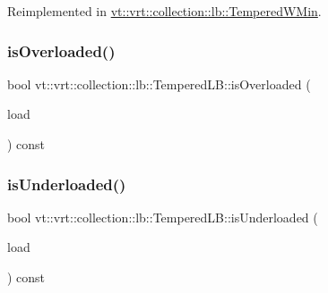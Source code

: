 Reimplemented in \hyperlink{structvt_1_1vrt_1_1collection_1_1lb_1_1_tempered_w_min_a0dd469ab6f3f8aebebf55c773df099ce}{vt\+::vrt\+::collection\+::lb\+::\+Tempered\+W\+Min}.

\mbox{\label{structvt_1_1vrt_1_1collection_1_1lb_1_1_tempered_l_b_ab737fad35804f7a6db9ae67a7a5fa982}} 
\subsubsection{\texorpdfstring{is\+Overloaded()}{isOverloaded()}}
{\footnotesize\ttfamily bool vt\+::vrt\+::collection\+::lb\+::\+Tempered\+L\+B\+::is\+Overloaded (\begin{DoxyParamCaption}\item[{\hyperlink{structvt_1_1vrt_1_1collection_1_1lb_1_1_base_l_b_a215e22b9f12678303f49615ae3be05cc}{Load\+Type}}]{load }\end{DoxyParamCaption}) const\hspace{0.3cm}{\ttfamily [protected]}}

\mbox{\label{structvt_1_1vrt_1_1collection_1_1lb_1_1_tempered_l_b_a499b448496764b6eb8c25f3dc8188e2c}} 
\subsubsection{\texorpdfstring{is\+Underloaded()}{isUnderloaded()}}
{\footnotesize\ttfamily bool vt\+::vrt\+::collection\+::lb\+::\+Tempered\+L\+B\+::is\+Underloaded (\begin{DoxyParamCaption}\item[{\hyperlink{structvt_1_1vrt_1_1collection_1_1lb_1_1_base_l_b_a215e22b9f12678303f49615ae3be05cc}{Load\+Type}}]{load }\end{DoxyParamCaption}) const\hspace{0.3cm}{\ttfamily [protected]}}

